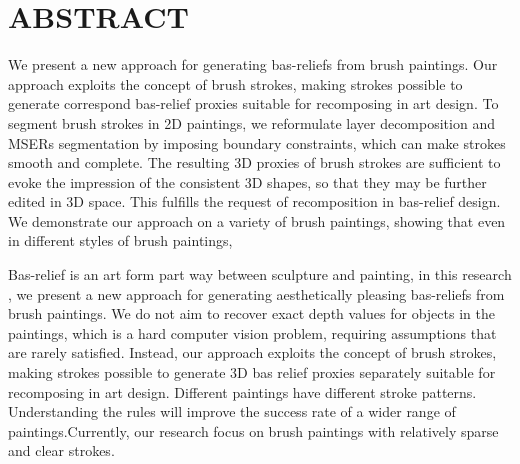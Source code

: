 \section*{\centering ABSTRACT}

We present a new approach for generating bas-reliefs from brush paintings. Our approach exploits the concept of brush strokes, making strokes possible to generate correspond bas-relief proxies suitable for recomposing in art design. To segment brush strokes in 2D paintings, we reformulate layer decomposition and MSERs segmentation by imposing boundary constraints, which can make strokes smooth and complete. The resulting 3D proxies of brush strokes are sufficient to evoke the impression of the consistent 3D shapes, so that they may be further edited in 3D space. This fulfills the request of recomposition in bas-relief design. We demonstrate our approach on a variety of brush paintings, showing that even in different styles of brush paintings, 

Bas-relief is an art form part way between sculpture and painting, in this research , we present a new approach for generating aesthetically pleasing bas-reliefs from brush paintings. We do not aim to recover exact depth values for objects in the paintings, which is a hard computer vision problem, requiring assumptions that are rarely satisfied. Instead, our approach exploits the concept of brush strokes, making strokes possible to generate 3D bas relief proxies separately suitable for recomposing in art design. Different paintings have different stroke patterns. Understanding the rules will improve the success rate of a wider range of paintings.Currently, our research focus on brush paintings with relatively sparse and clear strokes. 

